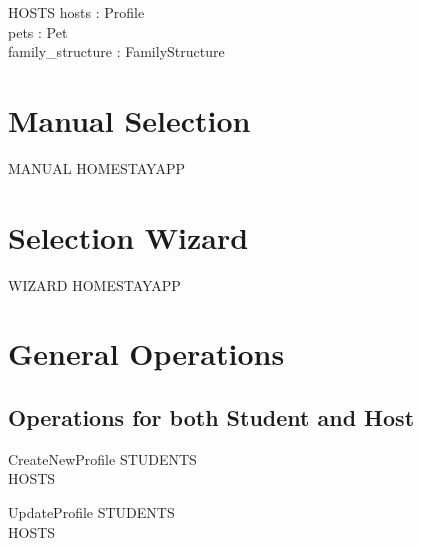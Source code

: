 \documentclass[11pt]{article}
\begin{document}
\begin{schema}{HOSTS}
	hosts : \power Profile\\
	pets : \power Pet\\
	family\_structure : FamilyStructure\\
\where

\end{schema}


\section*{Manual Selection}

\begin{schema}{MANUAL}
	\Xi HOMESTAYAPP\\
\end{schema}

\section*{Selection Wizard}

\begin{schema}{WIZARD}
	\Xi HOMESTAYAPP\\
\end{schema}


\section*{General Operations}

\subsection*{Operations for both Student and Host}

\begin{schema}{CreateNewProfile}
	\Delta STUDENTS\\
	\Delta HOSTS\\
\end{schema}

\begin{schema}{UpdateProfile}
	\Delta STUDENTS\\
	\Delta HOSTS\\
\end{schema}
\end{document}
